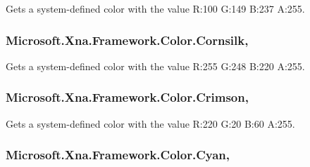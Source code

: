 Gets a system-\/defined color with the value R\+:100 G\+:149 B\+:237 A\+:255.

\hypertarget{struct_microsoft_1_1_xna_1_1_framework_1_1_color_a75e2587c0c1136424490341cf5bbff96}{}
\subsubsection[{Cornsilk}]{ Microsoft.\+Xna.\+Framework.\+Color.\+Cornsilk\hspace{0.3cm}{\ttfamily [static]}, {\ttfamily [get]}}\label{struct_microsoft_1_1_xna_1_1_framework_1_1_color_a75e2587c0c1136424490341cf5bbff96}


Gets a system-\/defined color with the value R\+:255 G\+:248 B\+:220 A\+:255.

\hypertarget{struct_microsoft_1_1_xna_1_1_framework_1_1_color_a4ad735d5d7f0f080ec3d2cceb3528dd6}{}
\subsubsection[{Crimson}]{ Microsoft.\+Xna.\+Framework.\+Color.\+Crimson\hspace{0.3cm}{\ttfamily [static]}, {\ttfamily [get]}}\label{struct_microsoft_1_1_xna_1_1_framework_1_1_color_a4ad735d5d7f0f080ec3d2cceb3528dd6}


Gets a system-\/defined color with the value R\+:220 G\+:20 B\+:60 A\+:255.

\hypertarget{struct_microsoft_1_1_xna_1_1_framework_1_1_color_a2af3041298a216a8a3e6064d23cfc4d1}{}
\subsubsection[{Cyan}]{ Microsoft.\+Xna.\+Framework.\+Color.\+Cyan\hspace{0.3cm}{\ttfamily [static]}, {\ttfamily [get]}}\label{struct_microsoft_1_1_xna_1_1_framework_1_1_color_a2af3041298a216a8a3e6064d23cfc4d1}


